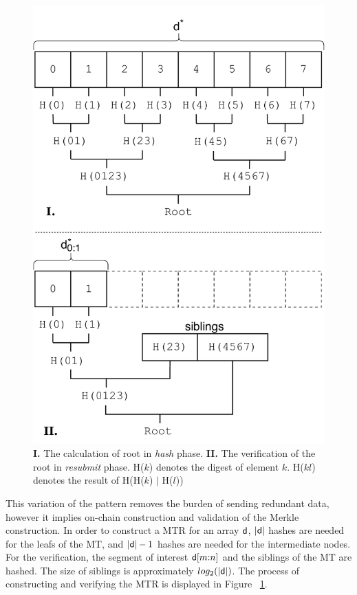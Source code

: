 \begin{figure}[h]
    \begin{center}
        \includegraphics[width=0.8\linewidth]{figures/merkle-har.pdf}
    \end{center}
    \caption{\textbf{I.} The calculation of root in \emph{hash} phase.
    \textbf{II.} The verification of the root in \emph{resubmit} phase.
    \textsf{H}($k$) denotes the digest of element $k$. \textsf{H}($kl$) denotes the
    result of \textsf{H}(\textsf{H}($k$) $|$ \textsf{H}($l$))}
    \label{fig:merkle-har}
\end{figure}

This variation of the pattern removes the burden of sending redundant data,
however it implies on-chain construction and validation of the Merkle
construction. In order to construct a MTR for an array $\mathsf{d}$,
$|\mathsf{d}|$ hashes are needed for the leafs of the MT, and $|\mathsf{d}| -
1$ hashes are needed for the intermediate nodes. For the verification, the
segment of interest $\mathsf{d}[m{:}n]$ and the siblings of the MT are hashed.
The size of siblings is approximately $log_2(|\mathsf{d}|)$. The process of
constructing and verifying the MTR is displayed in Figure
~\ref{fig:merkle-har}.

